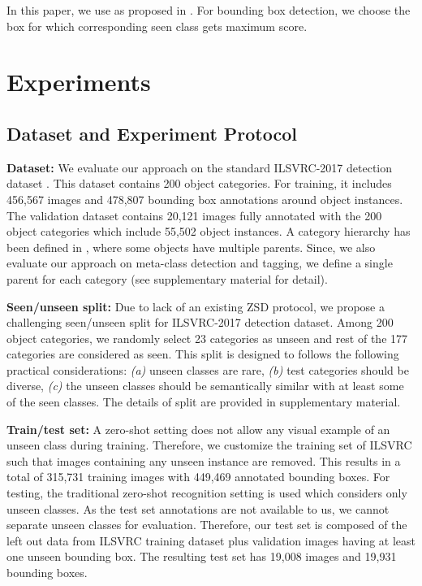 \documentclass[runningheads]{llncs}
\begin{document}
In this paper, we use  as proposed in \cite{norouzi_arXiv_2013}. For bounding box detection, we choose the box for which corresponding seen class gets maximum score.





    
    
\section{Experiments} \vspace{-0.5em}
	\subsection{Dataset and Experiment Protocol} \label{exp_protocol}    
    
\textbf{Dataset:} We evaluate our approach on the standard ILSVRC-2017 detection dataset \cite{ILSVRC_2015}. This dataset contains 200 object categories. For training, it includes 456,567 images and 478,807 bounding box annotations around object instances. The validation dataset contains 20,121 images fully annotated with the 200 object categories which include 55,502 object instances. A category hierarchy has been defined in \cite{ILSVRC_2015}, where some objects have multiple parents. Since, we also evaluate our approach on meta-class detection and tagging, we define a single parent for each category (see supplementary material for detail).

\textbf{Seen/unseen split:} 
Due to lack of an existing ZSD protocol, we propose a challenging seen/unseen split for ILSVRC-2017 detection dataset. Among 200 object categories, we randomly select 23  categories as unseen and rest of the 177 categories are considered as seen. This split is designed to follows the following practical considerations: \emph{(a)} unseen classes are rare, \emph{(b)} test categories should be diverse, \emph{(c)} the unseen classes should be semantically similar with at least some of the seen classes. The details of split are provided in supplementary material. 



\textbf{Train/test set:} A zero-shot setting does not allow any visual example of an unseen class during training. Therefore, we customize the training set of ILSVRC such that images containing any unseen instance are removed. This results in a total of 315,731 training images with 449,469 annotated bounding boxes. For testing, the traditional zero-shot recognition setting is used which considers only unseen classes. As the test set annotations are not available to us, we cannot separate unseen classes for evaluation. Therefore, our test set is composed of the left out data from ILSVRC training dataset plus validation images having at least one unseen bounding box. The resulting test set has 19,008 images and 19,931 bounding boxes.
\end{document}
